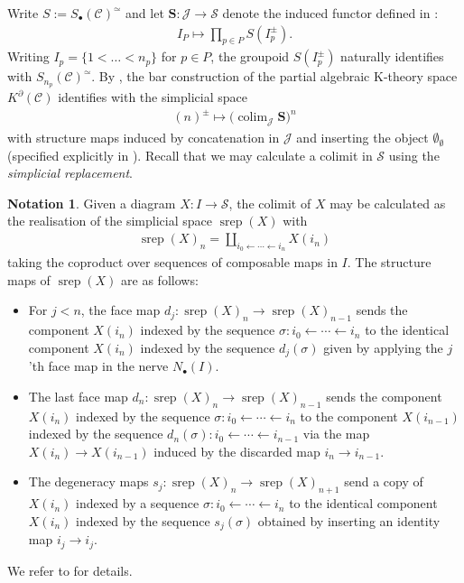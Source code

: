 \documentclass[12pt, reqno]{amsart}
\theoremstyle{plain}
\theoremstyle{definition}
\newtheorem{notation}[theorem]{Notation}
\begin{document}
Write $S:=S_\bullet(\mathcal{C})^\simeq$ and let $\mathbf{S}\colon \mathcal{J}\rightarrow \mathcal{S}$ denote the induced functor defined in :
\begin{align*}
I_P\mapsto \prod_{p\in P} S(I_p^\pm).
\end{align*}
Writing $I_p=\{1<\ldots<n_p\}$ for $p\in P$, the groupoid $S(I_p^\pm)$ naturally identifies with $S_{n_p}(\mathcal{C})^\simeq$. By , the bar construction of the partial algebraic K-theory space $K^\partial(\mathcal{C})$ identifies with the simplicial space
\begin{align*}
(n)^\pm \mapsto \big(\mathop{\operatorname{colim}}_{\mathcal{J}} \mathbf{S} \big)^n
\end{align*}
with structure maps induced by concatenation in $\mathcal{J}$ and inserting the object $\emptyset_\emptyset$ (specified explicitly in ). Recall that we may calculate a colimit in $\mathcal{S}$ using the \textit{simplicial replacement}.

\begin{notation}\label{simplicial replacement}
Given a diagram $X\colon I\rightarrow \mathcal{S}$, the colimit of $X$ may be calculated as the realisation of the simplicial space $\operatorname{srep}(X)$ with 
\begin{align*}
\operatorname{srep}(X)_n=\coprod_{i_0\leftarrow \cdots \leftarrow i_n} X(i_n)
\end{align*}
taking the coproduct over sequences of composable maps in $I$. The structure maps of $\operatorname{srep}(X)$ are as follows:
\begin{itemize}
\item For $j<n$, the face map $d_j\colon \operatorname{srep}(X)_n\rightarrow \operatorname{srep}(X)_{n-1}$ sends the component $X(i_n)$ indexed by the sequence $\sigma\colon i_0\leftarrow \cdots \leftarrow i_n$ to the identical component $X(i_n)$ indexed by the sequence $d_j(\sigma)$ given by applying the $j$'th face map in the nerve $N_\bullet(I)$.
\item The last face map $d_n\colon \operatorname{srep}(X)_n\rightarrow \operatorname{srep}(X)_{n-1}$ sends the component $X(i_n)$ indexed by the sequence $\sigma\colon i_0\leftarrow \cdots \leftarrow i_n$ to the component $X(i_{n-1})$ indexed by the sequence $d_n(\sigma)\colon i_0\leftarrow \cdots \leftarrow i_{n-1}$ via the map $X(i_n)\rightarrow X(i_{n-1})$ induced by the discarded map $i_n\rightarrow i_{n-1}$.
\item The degeneracy maps $s_j\colon \operatorname{srep}(X)_n\rightarrow \operatorname{srep}(X)_{n+1}$ send a copy of $X(i_n)$ indexed by a sequence $\sigma\colon i_0\leftarrow \cdots \leftarrow i_n$ to the identical component $X(i_n)$ indexed by the sequence $s_j(\sigma)$ obtained by inserting an identity map $i_j\rightarrow i_j$.
\end{itemize}
We refer to \cite{Dugger} for details.
\end{notation}
\end{document}
